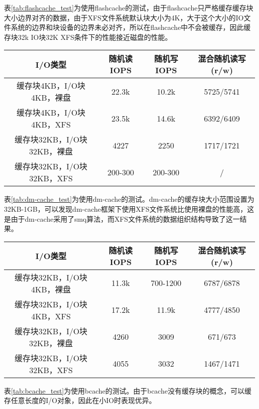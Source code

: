 表\ref{tab:flashcache_test}为使用flashcache的测试，由于flashcache只严格缓存缓存块大小边界对齐的数据，由于XFS文件系统默认块大小为4K，大于这个大小的IO文件系统的边界和块设备的边界未必对齐，所以在flashcache中不会被缓存，因此缓存块32k IO块32K XFS条件下的性能接近磁盘的性能。 

\begin{table}[H]
    \centering
    \begin{tabular}{cccc} 
      \toprule
      I/O类型 & 随机读IOPS & 随机写IOPS & 混合随机读写(r/w) \\ 
      \midrule
      缓存块4KB，I/O块4KB，裸盘 & 22.3k & 10.2k & 5725/5741 \\
      缓存块4KB，I/O块4KB，XFS & 23.5k & 14.6k & 6392/6409 \\
      缓存块32KB，I/O块32KB，裸盘 & 4227 & 2250 & 1717/1721 \\
      缓存块32KB，I/O块32KB，XFS & 200-300 & 200-300 & / \\
      \bottomrule
    \end{tabular}
\end{table}

表\ref{tab:dm-cache_test}为使用dm-cache的测试。dm-cache的缓存块大小范围设置为32KB-1GB，可以发现dm-cache框架下使用XFS文件系统比使用裸盘的性能高，这是由于dm-cache采用了smq算法，而XFS文件系统的数据组织结构导致了这一结果。 

\begin{table}[H]
    \centering
    \begin{tabular}{cccc} 
      \toprule
      I/O类型 & 随机读IOPS & 随机写IOPS & 混合随机读写(r/w) \\ 
      \midrule
      缓存块32KB，I/O块4KB，裸盘 & 11.3k & 700-1200 & 6787/6878 \\
      缓存块32KB，I/O块4KB，XFS & 17.2k & 11.9k & 4777/4850 \\
      缓存块32KB，I/O块32KB，裸盘 & 4260 & 3009 & 671/673 \\
      缓存块32KB，I/O块32KB，XFS & 4055 & 3032 & 1467/1471 \\
      \bottomrule
    \end{tabular}
\end{table}

表\ref{tab:bcache_test}为使用bcache的测试。由于bcache没有缓存块的概念，可以缓存任意长度的I/O对象，因此在小IO时表现优异。

